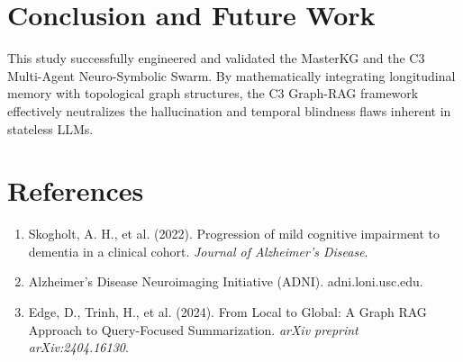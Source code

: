 \documentclass[11pt,a4paper]{article}
\begin{document}
\section{Conclusion and Future Work}

This study successfully engineered and validated the MasterKG and the C3 Multi-Agent Neuro-Symbolic Swarm. By mathematically integrating longitudinal memory with topological graph structures, the C3 Graph-RAG framework effectively neutralizes the hallucination and temporal blindness flaws inherent in stateless LLMs.

\section*{References}
\begin{enumerate}
    \item Skogholt, A. H., et al. (2022). Progression of mild cognitive impairment to dementia in a clinical cohort. \textit{Journal of Alzheimer's Disease}.
    \item Alzheimer's Disease Neuroimaging Initiative (ADNI). adni.loni.usc.edu.
    \item Edge, D., Trinh, H., et al. (2024). From Local to Global: A Graph RAG Approach to Query-Focused Summarization. \textit{arXiv preprint arXiv:2404.16130}.
\end{enumerate}
\end{document}
